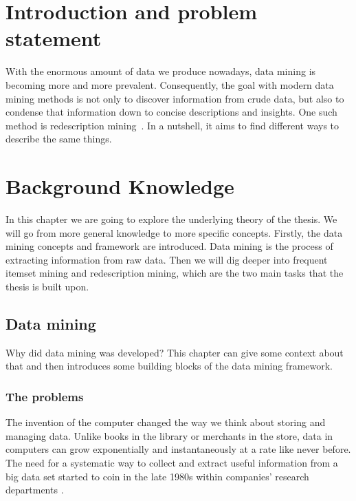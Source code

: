 \chapter{Introduction and problem statement}
\label{cha:intro}
With the enormous amount of data we produce nowadays, data mining is becoming more and more prevalent.
Consequently, the goal with modern data mining methods is not only to discover information from crude data, but also to condense that information down to concise descriptions and insights.
One such method is redescription mining~\citep{ramakrishnan_turning_2004}.
In a nutshell, it aims to find different ways to describe the same things.

\chapter{Background Knowledge}
\label{cha:background}
In this chapter we are going to explore the underlying theory of the thesis.
We will go from more general knowledge to more specific concepts.
Firstly, the data mining concepts and framework are introduced.
Data mining is the process of extracting information from raw data.
Then we will dig deeper into frequent itemset mining and redescription mining, which are the two main tasks that the thesis is built upon.
\section{Data mining}
\label{sec:datamining}
Why did data mining was developed?
This chapter can give some context about that and then introduces some building blocks of the data mining framework.
\subsection{The problems}
\label{sub:the_problems}
The invention of the computer changed the way we think about storing and managing data.
Unlike books in the library or merchants in the store, data in computers can grow exponentially and instantaneously at a rate like never before.
The need for a systematic way to collect and extract useful information from a big data set started to coin in the late 1980s within companies' research departments \citep{coenen_datamining_2011}.

